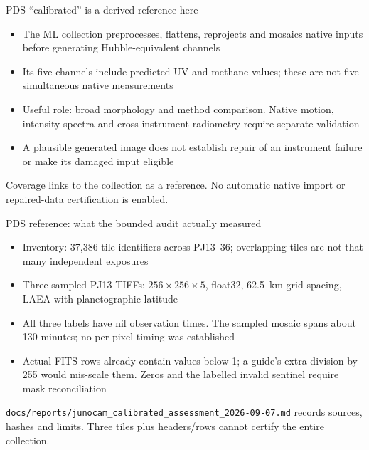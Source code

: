 \documentclass[aspectratio=169,11pt]{beamer}
\newcommand{\currevsec}{}
\newcommand{\revsec}[1]{\gdef\currevsec{#1}}
\begin{document}
\begin{frame}{PDS ``calibrated'' is a derived reference here}
  \revsec{4.18}
\begin{itemize}
    \item The ML collection preprocesses, flattens, reprojects and mosaics native inputs before generating Hubble-equivalent channels
    \item Its five channels include predicted UV and methane values; these are not five simultaneous native measurements
    \item Useful role: broad morphology and method comparison. Native motion, intensity spectra and cross-instrument radiometry require separate validation
    \item A plausible generated image does not establish repair of an instrument failure or make its damaged input eligible
  \end{itemize}
  Coverage links to the collection as a reference. No automatic native import or repaired-data certification is enabled.
\end{frame}

\begin{frame}{PDS reference: what the bounded audit actually measured}
  \revsec{4.18}
\small
  \begin{itemize}
    \item Inventory: 37{,}386 tile identifiers across PJ13--36; overlapping tiles are not that many independent exposures
    \item Three sampled PJ13 TIFFs: $256\times256\times5$, float32, 62.5~km grid spacing, LAEA with planetographic latitude
    \item All three labels have nil observation times. The sampled mosaic spans about 130 minutes; no per-pixel timing was established
    \item Actual FITS rows already contain values below 1; a guide's extra division by 255 would mis-scale them. Zeros and the labelled invalid sentinel require mask reconciliation
  \end{itemize}
  \vspace{0.1cm}
  \texttt{docs/reports/junocam\_calibrated\_assessment\_2026-09-07.md} records sources, hashes and limits. Three tiles plus headers/rows cannot certify the entire collection.
\end{frame}
\end{document}
